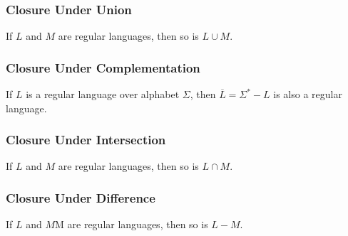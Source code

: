 \documentclass[]{article}
\begin{document}
    \subsubsection*{Closure Under Union}
      \begin{thm}
        If $L$ and $M$ are regular languages, then so is $L \cup M$.
      \end{thm}
    \subsubsection*{Closure Under Complementation}
      \begin{thm}
        If $L$ is a regular language over alphabet $\Sigma$, then
        $\overline{L} = \Sigma^* - L$ is also a regular language.
      \end{thm}
    \subsubsection*{Closure Under Intersection}
      \begin{thm}
        If $L$ and $M$ are regular languages, then so is $L \cap M$.
      \end{thm}
    \subsubsection*{Closure Under Difference}
      \begin{thm}
        If $L$ and $M$M are regular languages, then so is $L - M$.
      \end{thm}
\end{document}
